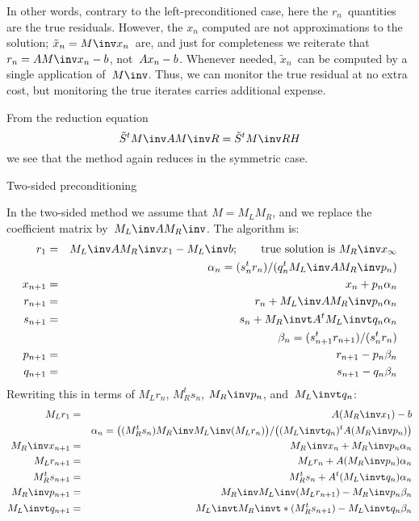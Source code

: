 \documentclass[11pt]{artikel3}
\begin{document}
\begin{Outline}
In other words,
contrary to the left-preconditioned case, here the $r_n$~quantities
are the true residuals. However, the $x_n$ computed are not approximations
to the solution; $\tilde x_n=M\inv x_n$~are, and just for completeness
we reiterate that $r_n=AM\inv x_n-b$, not~$Ax_n\nobreak-b$.
Whenever needed, $\tilde x_n$~can be computed by a single application
of~$M\inv$. Thus, we can monitor the true residual at no extra cost,
but monitoring the true iterates carries additional expense.

From the reduction
equation \[ \tilde S^tM\inv AM\inv R=\tilde S^tM\inv RH \] we see that the
method again reduces in the symmetric case.

 {Two-sided preconditioning}

In the two-sided method we assume that $M=M_LM_R$, and we replace
the coefficient matrix by~$M_L\inv AM_R\inv$. The algorithm is:
\begin{eqnarray*}
    r_1&=&M_L\inv AM_R\inv x_1-M_L\inv b;
                    \qquad\hbox{true solution is $M_R\inv x_\infty$}\\
    &&\alpha_n=(s_n^tr_n)/(q_n^tM_L\inv AM_R\inv p_n)\\
    x_{n+1}&=&x_n+p_n\alpha_n\\
    r_{n+1}&=&r_n+M_L\inv AM_R\inv p_n\alpha_n\\
    s_{n+1}&=&s_n+M_R\invt A^tM_L\invt q_n\alpha_n\\
    &&\beta_n=(s_{n+1}^tr_{n+1})/(s_n^tr_n)\\
    p_{n+1}&=&r_{n+1}-p_n\beta_n\\
    q_{n+1}&=&s_{n+1}-q_n\beta_n
\end{eqnarray*}
Rewriting this in terms of $M_Lr_n$, $M_R^ts_n$, $M_R\inv p_n$, 
and~$M_L\invt q_n$:
\begin{eqnarray*}
    M_Lr_1&=&A(M_R\inv x_1)-b\\
    &&\alpha_n=\bigl((M_R^ts_n)M_R\inv M_L\inv(M_Lr_n)\bigr) /
                \bigl((M_L\invt q_n)^tA(M_R\inv p_n)\bigr)\\
    M_R\inv x_{n+1}&=&M_R\inv x_n+M_R\inv p_n\alpha_n\\
    M_Lr_{n+1}&=&M_Lr_n+A(M_R\inv p_n)\alpha_n\\
    M_R^ts_{n+1}&=&M_R^ts_n+A^t(M_L\invt q_n)\alpha_n\\
    M_R\inv p_{n+1}&=&M_R\inv M_L\inv(M_Lr_{n+1})-M_R\inv p_n\beta_n\\
    M_L\invt q_{n+1}&=&M_L\invt M_R\invt*(M_R^ts_{n+1})-M_L\invt q_n\beta_n
\end{eqnarray*}

\end{Outline}
\end{document}
